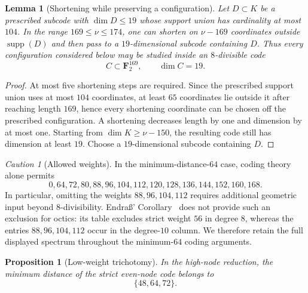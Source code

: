 \documentclass[11pt,reqno]{amsart}
\newtheorem{proposition}[theorem]{Proposition}
\newtheorem{lemma}[theorem]{Lemma}
\theoremstyle{remark}
\newtheorem{warning}[theorem]{Caution}
\newcommand{\F}{\mathbf F}
\newcommand{\supp}{\operatorname{supp}}
\begin{document}
\begin{lemma}[Shortening while preserving a configuration]\label{lem:shorten}
Let $D\subset K$ be a prescribed subcode with $\dim D\le19$ whose support union has cardinality at most $104$.  In the range $169\le\nu\le174$, one can shorten on $\nu-169$ coordinates outside $\supp(D)$ and then pass to a $19$-dimensional subcode containing $D$.  Thus every configuration considered below may be studied inside an $8$-divisible code
\[
C\subset\F_2^{169},\qquad \dim C=19.
\]
\end{lemma}

\begin{proof}
At most five shortening steps are required.  Since the prescribed support union uses at most $104$ coordinates, at least $65$ coordinates lie outside it after reaching length $169$, hence every shortening coordinate can be chosen off the prescribed configuration.  A shortening decreases length by one and dimension by at most one.  Starting from $\dim K\ge\nu-150$, the resulting code still has dimension at least $19$.  Choose a $19$-dimensional subcode containing $D$.
\end{proof}

\begin{warning}[Allowed weights]
In the minimum-distance-$64$ case, coding theory alone permits
\[
0,64,72,80,88,96,104,112,120,128,136,144,152,160,168.
\]
In particular, omitting the weights $88,96,104,112$ requires additional geometric input beyond $8$-divisibility.  Endra\ss' Corollary~\cite[Cor.~1.11]{EndrassMinimal} does not provide such an exclusion for octics: its table excludes strict weight $56$ in degree $8$, whereas the entries $88,96,104,112$ occur in the degree-$10$ column.  We therefore retain the full displayed spectrum throughout the minimum-$64$ coding arguments.
\end{warning}

\begin{proposition}[Low-weight trichotomy]\label{prop:trichotomy}
In the high-node reduction, the minimum distance of the strict even-node code belongs to
\[
\{48,64,72\}.
\]
\end{proposition}
\end{document}

